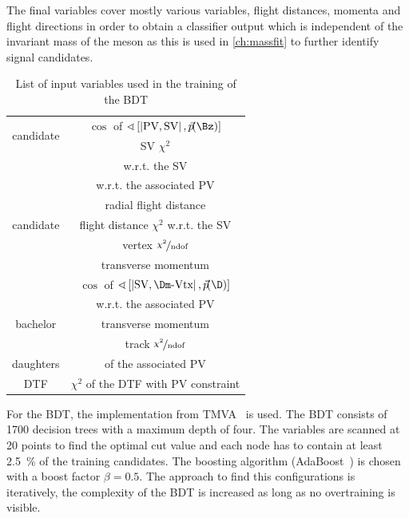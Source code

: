 The final variables cover mostly various \chisqip variables, flight distances, momenta and flight directions in order to obtain a classifier output which is independent of the invariant mass of the \Bz meson as this is used in \cref{ch:massfit} to further identify signal candidates.
\begin{table}[tbp]
	\centering
	\caption{List of input variables used in the training of the BDT}
	\begin{tabular}{cc}
		\toprule
		\multirow{2}{*}{\Bz candidate}	& $\cos$ of $\sphericalangle\left[\left|\text{PV},\text{SV}\right|,\vec{p}\!(\Bz)\right]$ \\
										& \ac{SV} $\chi^2$\\
		\midrule
		\multirow{7}{*}{\Dm candidate}	& \chisqip w.r.t. the \ac{SV}\\
										& \chisqip w.r.t. the associated PV\\
										& radial flight distance\\
										& flight distance $\chi^2$ w.r.t. the \ac{SV}\\
										& \Dm vertex $\nicefrac{\chi^2}{\text{ndof}}$\\
										& transverse momentum \pt \\
										& $\cos$ of $\sphericalangle\left[\left|\text{SV},\Dm\text{-Vtx}\right|,\vec{p}\!(\D)\right]$ \\
		\midrule
		\multirow{3}{*}{bachelor \pion}	& \chisqip w.r.t. the associated PV\\
										& transverse momentum \pt\\
										& track $\nicefrac{\chi^2}{\text{ndof}}$\\
		\midrule
		\Dm daughters					& \chisqip of the associated \ac{PV}\\
		\midrule
		DTF 							& $\chi^2$ of the DTF with \ac{PV} constraint \\
		\bottomrule
	\end{tabular}
	\label{tab:BDTInput}
\end{table}
For the \ac{BDT}, the implementation from TMVA~\cite{Hocker:2007ht} is used.
The \ac{BDT} consists of \num{1700} decision trees with a maximum depth of four.
The variables are scanned at \num{20} points to find the optimal cut value and each node has to contain at least \SI{2.5}{\percent} of the training candidates.
The boosting algorithm (AdaBoost~\cite{AdaBoost}) is chosen with a boost factor $\beta=0.5$.
The approach to find this configurations is iteratively, \ie the complexity of the \ac{BDT} is increased as long as no overtraining is visible.
